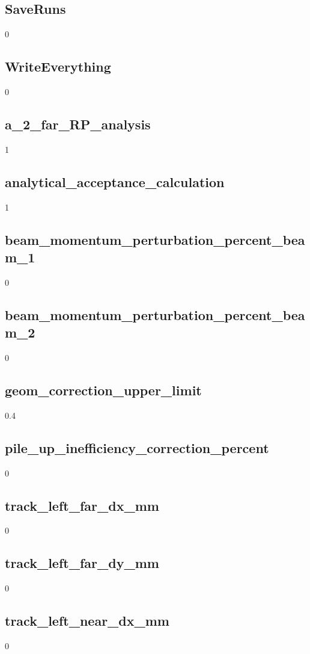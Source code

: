 \documentclass{article}
\begin{document}
\begin{landscape}
\subsection{SaveRuns}
0 \newline
\subsection{WriteEverything}
0 \newline
\subsection{a\_2\_far\_RP\_analysis}
1 \newline
\subsection{analytical\_acceptance\_calculation}
1 \newline
\subsection{beam\_momentum\_perturbation\_percent\_beam\_1}
0 \newline
\subsection{beam\_momentum\_perturbation\_percent\_beam\_2}
0 \newline
\subsection{geom\_correction\_upper\_limit}
0.4 \newline
\subsection{pile\_up\_inefficiency\_correction\_percent}
0 \newline
\subsection{track\_left\_far\_dx\_mm}
0 \newline
\subsection{track\_left\_far\_dy\_mm}
0 \newline
\subsection{track\_left\_near\_dx\_mm}
0 \newline

\end{landscape}
\end{document}
